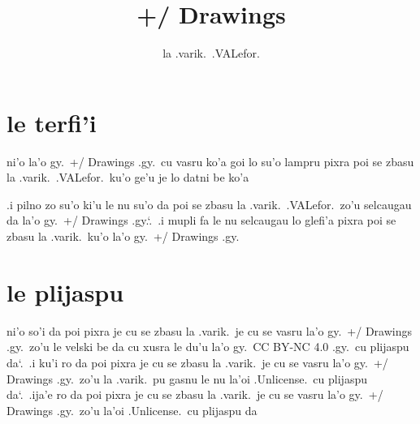 \documentclass{report}
\title{+/ Drawings}
\author{la .varik.\ .VALefor.}
\newcommand\sds{\spacefactor\sfcode`.\ \space}
\begin{document}
\maketitle{}
\tableofcontents{}
\chapter{le terfi'i}
ni'o la'o gy.\ +/ Drawings .gy.\  cu vasru ko'a goi lo su'o lampru pixra poi se zbasu la .varik.\ .VALefor.\ ku'o ge'u je lo datni be ko'a

.i pilno zo su'o ki'u le nu su'o da poi se zbasu la .varik.\ .VALefor.\ zo'u selcaugau da la'o gy.\ +/ Drawings .gy.\sds  .i mupli fa le nu selcaugau lo glefi'a pixra poi se zbasu la .varik.\ ku'o la'o gy.\ +/ Drawings .gy.

\chapter{le plijaspu}
ni'o so'i da poi pixra je cu se zbasu la .varik.\ je cu se vasru la'o gy.\ +/ Drawings .gy.\ zo'u le velski be da cu xusra le du'u la'o gy.\ CC BY-NC 4.0 .gy.\ cu plijaspu da\sds  .i ku'i ro da poi pixra je cu se zbasu la .varik.\ je cu se vasru la'o gy.\ +/ Drawings .gy.\ zo'u la .varik.\ pu gasnu le nu la'oi .Unlicense.\ cu plijaspu da\sds  .ija'e ro da poi pixra je cu se zbasu la .varik.\ je cu se vasru la'o gy.\ +/ Drawings .gy.\ zo'u la'oi .Unlicense.\ cu plijaspu da
\end{document}
